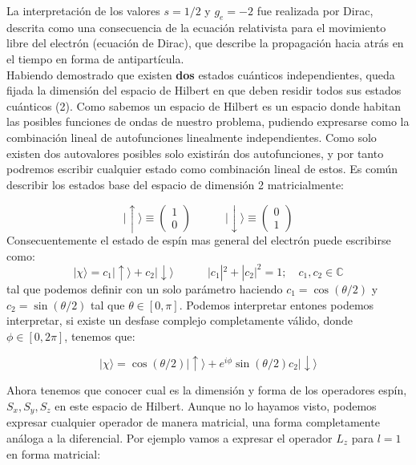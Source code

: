\documentclass[12pt]{article}
\newcommand{\tquad}{\quad \quad \quad}
\newcommand{\eup}{\mid \uparrow \rangle}
\newcommand{\edw}{\mid \downarrow \rangle}
\begin{document}
La interpretación de los valores $s=1/2$ y $g_e = -2$ fue realizada por Dirac, descrita como una consecuencia de la ecuación relativista para el movimiento libre del electrón (ecuación de Dirac), que describe la propagación hacia atrás en el tiempo en forma de antipartícula. \\

Habiendo demostrado que existen \textbf{dos} estados cuánticos independientes, queda fijada la dimensión del espacio de Hilbert en que deben residir todos sus estados cuánticos (2). Como sabemos un espacio de Hilbert es un espacio donde habitan las posibles funciones de ondas de nuestro problema, pudiendo expresarse como la combinación lineal de autofunciones linealmente independientes. Como solo existen dos autovalores posibles solo existirán dos autofunciones, y por tanto podremos escribir cualquier estado como combinación lineal de estos. Es común describir los estados base del espacio de dimensión 2 matricialmente:

\begin{equation}
\eup \equiv \begin{pmatrix}
1 \\
0
\end{pmatrix} \tquad \edw \equiv \begin{pmatrix}
0 \\
1
\end{pmatrix}
\end{equation}
Consecuentemente el estado de espín mas general del electrón puede escribirse como:
\begin{equation}
| \chi \rangle = c_1 \eup + c_2 \edw \tquad | c_1 |^2 + |c_2 |^2 = 1; \quad c_1, c_2 \in \mathbb{C}
\end{equation}
tal que podemos definir con un solo parámetro haciendo $c_1 = \cos (\theta/2)$ y $c_2 = \sin ( \theta / 2)$ tal que $\theta \in [0,\pi]$. Podemos interpretar entones podemos interpretar, si existe un desfase complejo completamente válido, donde $\phi \in [0,2\pi]$, tenemos que:

\begin{equation}
| \chi \rangle = \cos (\theta/2) \eup + e^{i \phi} \sin(\theta/2) c_2 \edw 
\end{equation}

Ahora tenemos que conocer cual es la dimensión y forma de los operadores espín, $S_x,S_y,S_z$ en este espacio de Hilbert. Aunque no lo hayamos visto, podemos expresar cualquier operador de manera matricial, una forma completamente análoga a la diferencial. Por ejemplo vamos a expresar el operador $L_z$ para $l=1$ en forma matricial: \\
\end{document}
